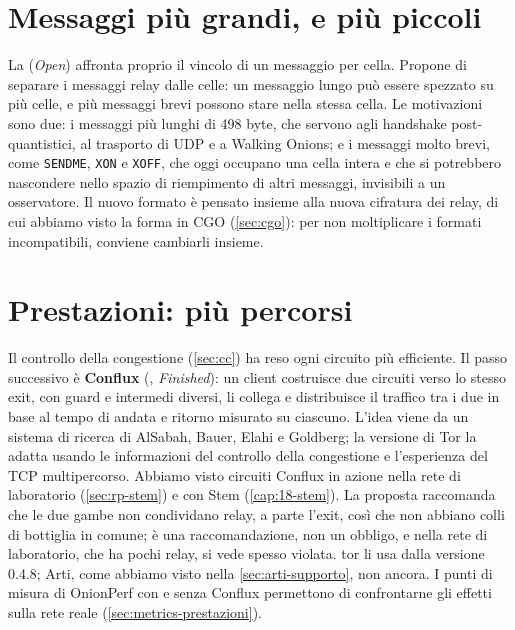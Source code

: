 \section{Messaggi più grandi, e più piccoli}\label{sec:fut-340}

La  (\emph{Open}) affronta proprio il vincolo di un messaggio per cella. Propone di separare i messaggi relay dalle celle: un messaggio lungo può essere spezzato su più celle, e più messaggi brevi possono stare nella stessa cella. Le motivazioni sono due: i messaggi più lunghi di 498 byte, che servono agli handshake post-quantistici, al trasporto di UDP e a Walking Onions; e i messaggi molto brevi, come \texttt{SENDME}, \texttt{XON} e \texttt{XOFF}, che oggi occupano una cella intera e che si potrebbero nascondere nello spazio di riempimento di altri messaggi, invisibili a un osservatore. Il nuovo formato è pensato insieme alla nuova cifratura dei relay, di cui abbiamo visto la forma in CGO (\cref{sec:cgo}): per non moltiplicare i formati incompatibili, conviene cambiarli insieme.

\section{Prestazioni: più percorsi}\label{sec:fut-conflux}

Il controllo della congestione (\cref{sec:cc}) ha reso ogni circuito più efficiente. Il passo successivo è \textbf{Conflux} (, \emph{Finished}): un client costruisce due circuiti verso lo stesso exit, con guard e intermedi diversi, li collega e distribuisce il traffico tra i due in base al tempo di andata e ritorno misurato su ciascuno. L'idea viene da un sistema di ricerca di AlSabah, Bauer, Elahi e Goldberg; la versione di Tor la adatta usando le informazioni del controllo della congestione e l'esperienza del TCP multipercorso. Abbiamo visto circuiti Conflux in azione nella rete di laboratorio (\cref{sec:rp-stem}) e con Stem (\cref{cap:18-stem}). La proposta raccomanda che le due gambe non condividano relay, a parte l'exit, così che non abbiano colli di bottiglia in comune; è una raccomandazione, non un obbligo, e nella rete di laboratorio, che ha pochi relay, si vede spesso violata. tor li usa dalla versione 0.4.8; Arti, come abbiamo visto nella \cref{sec:arti-supporto}, non ancora. I punti di misura di OnionPerf con e senza Conflux permettono di confrontarne gli effetti sulla rete reale (\cref{sec:metrics-prestazioni}).

